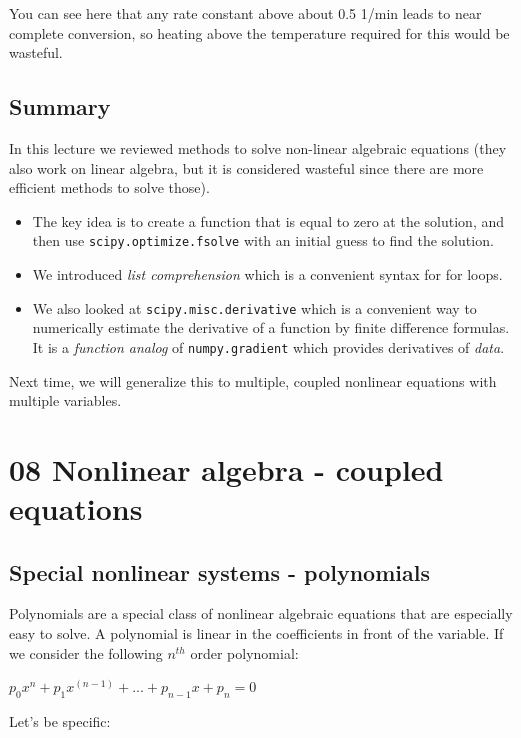 \documentclass[11pt]{article}
\begin{document}
You can see here that any rate constant above about 0.5 1/min leads to near complete conversion, so heating above the temperature required for this would be wasteful.


\subsection{Summary}
\label{sec:org192b006}

In this lecture we reviewed methods to solve non-linear algebraic equations (they also work on linear algebra, but it is considered wasteful since there are more efficient methods to solve those).

\begin{itemize}
\item The key idea is to create a function that is equal to zero at the solution, and then use \texttt{scipy.optimize.fsolve} with an initial guess to find the solution.
\item We introduced \emph{list comprehension} which is a convenient syntax for for loops.
\item We also looked at \texttt{scipy.misc.derivative} which is a convenient way to numerically estimate the derivative of a function by finite difference formulas. It is a \emph{function analog} of \texttt{numpy.gradient} which provides derivatives of \emph{data}.
\end{itemize}

Next time, we will generalize this to multiple, coupled nonlinear equations with multiple variables.

\section{08 Nonlinear algebra - coupled equations}
\label{sec:org25e1080}


\subsection{Special nonlinear systems - polynomials}
\label{sec:orgc4564a2}

Polynomials are a special class of nonlinear algebraic equations that are especially easy to solve. A polynomial is linear in the coefficients in front of the variable. If we consider the following \(n^{th}\) order polynomial:

\(p_0 x^n + p_1 x^{(n-1)} + ... + p_{n-1} x + p_n = 0\)

Let's be specific:
\end{document}

